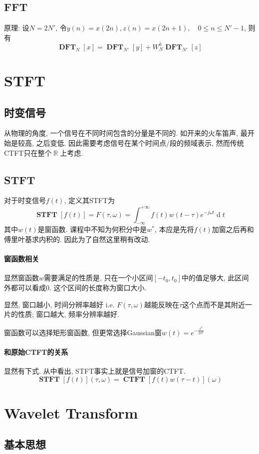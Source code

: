 \documentclass{ctexart}
\DeclareMathOperator{\CTFT}{\mathbf{CTFT}}
\DeclareMathOperator{\DFT}{\mathbf{DFT}}
\DeclareMathOperator{\ud}{\mathrm{d}}
\DeclareMathOperator{\Rset}{\mathbb{R}}
\DeclareMathOperator{\STFT}{\mathbf{STFT}}
\begin{document}
\subsection{FFT}
    原理: 设$N = 2N'$, 令$y(n) = x(2n), z(n) = x(2n+1),\quad 0 \le n \le N' - 1$, 则有\[
        \DFT_{N} [x] = \DFT_{N'} [y] + W_N^k \DFT_{N'} [z] \]

\section{STFT}
\subsection{时变信号} 从物理的角度, 一个信号在不同时间包含的分量是不同的.
    如开来的火车笛声, 最开始是较高, 之后变低.
    因此需要考虑信号在某个时间点/段的频域表示, 然而传统CTFT只在整个$\Rset$上考虑.
\subsection{STFT}
    对于时变信号$f(t)$, 定义其STFT为\[
        \STFT[f(t)] = F(\tau, \omega) = \int_{-\infty}^{+\infty} f(t) w(t - \tau) e^{-j\omega t} \ud t\]
    其中$w(t)$是窗函数.
    课程中不知为何积分中是$w^*$, 本应是先将$f(t)$加窗之后再和傅里叶基求内积的.
    因此为了自然这里稍有改动.
\paragraph{窗函数相关} 显然窗函数$w$需要满足的性质是,
    只在一个小区间$[-t_0, t_0]$中的值足够大, 此区间外都可以看成$0$.
    这个区间的长度称为窗口大小.\par
    显然, 窗口越小, 时间分辨率越好 i.e. $F(\tau, \omega)$越能反映在$\tau$这个点而不是其附近一片的性质;
    窗口越大, 频率分辨率越好.\par
    窗函数可以选择矩形窗函数, 但更常选择Gaussian窗$w(t) = e^{-\frac{t^2}{2 \sigma^2}}$
\paragraph{和原始CTFT的关系} 显然有下式. 从中看出, STFT事实上就是信号加窗的CTFT.
    \[ \STFT[f(t)](\tau, \omega) = \CTFT[f(t)w(\tau-t)](\omega)\]

\section{Wavelet Transform}
\subsection{基本思想}
\end{document}
